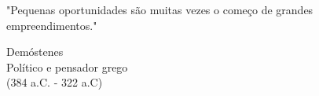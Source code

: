 \epigraph{"Pequenas oportunidades são muitas vezes o começo de grandes empreendimentos."}{Demóstenes\\Político e pensador grego\\(384 a.C. - 322 a.C)}
